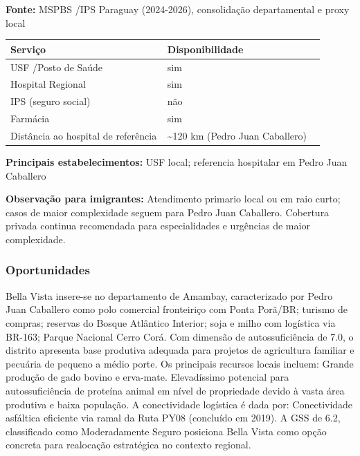 \textbf{Fonte:} MSPBS /\allowbreak  IPS Paraguay (2024-2026), consolidação
departamental e proxy local

{\def\LTcaptype{none} %
\begin{longtable}{@{}>{\raggedright\arraybackslash}p{0.45\linewidth} >{\raggedright\arraybackslash}p{0.45\linewidth}@{}}
\toprule\noalign{}
Serviço & Disponibilidade \\
\midrule\noalign{}
\endhead
\bottomrule\noalign{}
\endlastfoot
USF /\allowbreak  Posto de Saúde & sim \\
Hospital Regional & sim \\
IPS (seguro social) & não \\
Farmácia & sim \\
Distância ao hospital de referência & \textasciitilde120 km (Pedro Juan
Caballero) \\
\end{longtable}
}

\textbf{Principais estabelecimentos:} USF local; referencia hospitalar
em Pedro Juan Caballero

\textbf{Observação para imigrantes:} Atendimento primario local ou em
raio curto; casos de maior complexidade seguem para Pedro Juan
Caballero. Cobertura privada continua recomendada para especialidades e
urgências de maior complexidade.
\newpage

\subsubsection*{Oportunidades}\label{oport-bella-vista-1302}
Bella Vista insere-se no departamento de Amambay, caracterizado por Pedro Juan Caballero como polo comercial fronteiriço com Ponta Porã/BR; turismo de compras; reservas do Bosque Atlântico Interior; soja e milho com logística via BR-163; Parque Nacional Cerro Corá. Com dimensão de autossuficiência de 7.0, o distrito apresenta base produtiva adequada para projetos de agricultura familiar e pecuária de pequeno a médio porte. Os principais recursos locais incluem: Grande produção de gado bovino e erva-mate. Elevadíssimo potencial para autossuficiência de proteína animal em nível de propriedade devido à vasta área produtiva e baixa população. A conectividade logística é dada por: Conectividade asfáltica eficiente via ramal da Ruta PY08 (concluído em 2019). A GSS de 6.2, classificado como Moderadamente Seguro posiciona Bella Vista como opção concreta para realocação estratégica no contexto regional.

